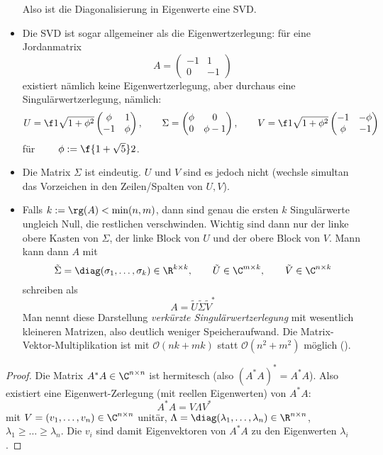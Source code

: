 \documentclass[11pt]{scrbook}
\begin{document}
\begin{st}
\begin{note}
\begin{itemize}
				Also ist die Diagonalisierung in Eigenwerte eine SVD.
			\item
				Die SVD ist sogar allgemeiner als die Eigenwertzerlegung:
				für eine Jordanmatrix
				\[
					A = \begin{pmatrix}
						-1 & 1 \\
						0 & -1
					\end{pmatrix}
				\]
				existiert nämlich keine Eigenwertzerlegung, aber durchaus eine Singulärwertzerlegung, nämlich:
				\[
					U = \f 1{\sqrt{1+\phi^2}} \begin{pmatrix}
						\phi & 1 \\
						-1 & \phi
					\end{pmatrix}, \qquad
					\Sigma = \begin{pmatrix}
						\phi & 0 \\
						0 & \phi -1
					\end{pmatrix}, \qquad 
					V = \f 1{\sqrt{1+\phi^2}} \begin{pmatrix}
						-1 & -\phi \\
						\phi & - 1
					\end{pmatrix}
				\]
				für $\qquad \phi := \f {1+\sqrt 5}2$.
			\item
				Die Matrix $\Sigma$ ist eindeutig. 
				$U$ und $V$ sind es jedoch nicht (wechsle simultan das Vorzeichen in den Zeilen/Spalten von $U,V$).
			\item
				Falls $k := \rg(A) < \min(n,m)$, dann sind genau die ersten $k$ Singulärwerte ungleich Null, die restlichen verschwinden.
				Wichtig sind dann nur der linke obere Kasten von $\Sigma$, der linke Block von $U$ und der obere Block von $V$.
				Mann kann dann $A$ mit
				\[
					\tilde \Sigma = \diag(\sigma_1,\dotsc,\sigma_k) \in \R^{k\times k}
					, \qquad 
					\tilde U \in \C^{m\times k}
					, \qquad 
					\tilde V \in \C^{n\times k}
				\]
				schreiben als
				\[
					A = \tilde U \tilde \Sigma \tilde V^*
				\]
				Man nennt diese Darstellung \emph{verkürzte Singulärwertzerlegung} mit wesentlich kleineren Matrizen, also deutlich weniger Speicheraufwand.
				Die Matrix-Vektor-Multiplikation ist mit $\mathcal O(nk+mk)$ statt $\mathcal O(n^2 + m^2)$ möglich ().
		\end{itemize}
	\end{note}
	\begin{proof}
		Die Matrix $A^*A \in \C^{n\times n}$ ist hermitesch (also $(A^*A)^*=A^*A$).
		Also existiert eine Eigenwert-Zerlegung (mit reellen Eigenwerten) von $A^*A$:
		\[
			A^*A = V\Lambda V^*
		\]
		mit $V=(v_1,\dotsc, v_n)\in \C^{n\times n}$ unitär, $\Lambda = \diag(\lambda_1,\dotsc,\lambda_n) \in \R^{n\times n}$, $\lambda_1\ge \dotsc \ge \lambda_n$.
		Die $v_i$ sind damit Eigenvektoren von $A^*A$ zu den Eigenwerten $\lambda_i$.


\end{proof}
\end{st}
\end{document}
